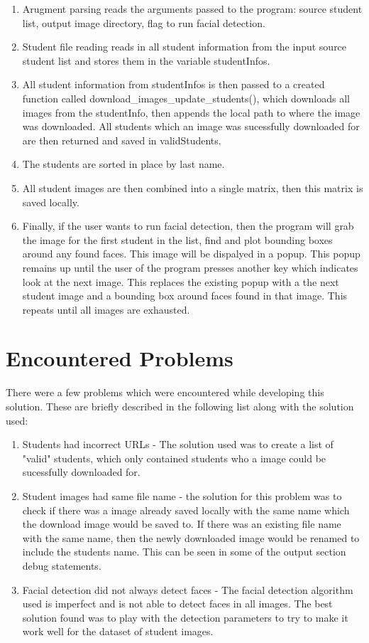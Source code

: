 \documentclass[12pt, letterpaper, final, onecolumn, titlepage] {article}
\begin{document}
\begin{enumerate}
	\item Arugment parsing reads the arguments passed to the program: source student list, output image directory, flag to run facial detection.
	\item Student file reading reads in all student information from the input source student list and stores them in the variable studentInfos.
	\item All student information from studentInfos is then passed to a created function called download\_images\_update\_students(), which downloads all images from the studentInfo, then appends the local path to where the image was downloaded. All students which an image was sucessfully downloaded for are then returned and saved in validStudents.
	\item The students are sorted in place by last name.
	\item All student images are then combined into a single matrix, then this matrix is saved locally.
	\item Finally, if the user wants to run facial detection, then the program will grab the image for the first student in the list, find and plot bounding boxes around any found faces. This image will be dispalyed in a popup. This popup remains up until the user of the program presses another key which indicates look at the next image. This replaces the existing popup with a the next student image and a bounding box around faces found in that image. This repeats until all images are exhausted.
\end{enumerate}

\pagebreak
\section{Encountered Problems}
There were a few problems which were encountered while developing this solution. These are briefly described in the following list along with the solution used:
\begin{enumerate}
	\item Students had incorrect URLs - The solution used was to create a list of "valid" students, which only contained students who a image could be sucessfully downloaded for.
	\item Student images had same file name - the solution for this problem was to check if there was a image already saved locally with the same name which the download image would be saved to. If there was an existing file name with the same name, then the newly downloaded image would be renamed to include the students name. This can be seen in some of the output section debug statements.
	\item Facial detection did not always detect faces - The facial detection algorithm used is imperfect and is not able to detect faces in all images. The best solution found was to play with the detection parameters to try to make it work well for the dataset of student images.
\end{enumerate}
\end{document}
